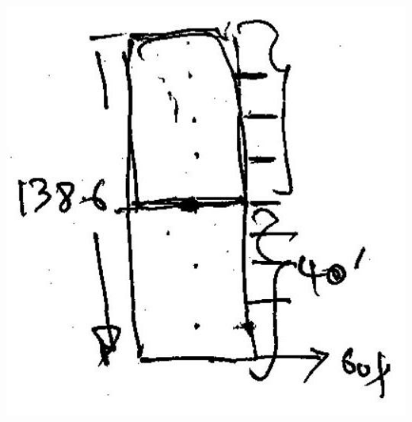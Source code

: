 \documentclass[10pt]{article}
\begin{document}
\includegraphics[max width=\textwidth]{2022_11_11_ca6a6c1a0324ee23e523g-16}
\end{document}
